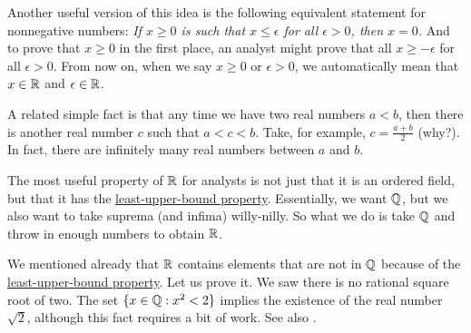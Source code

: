 Another useful version of this idea is the following equivalent
statement for nonnegative numbers: \emph{If $x \geq 0$ is such that $x \leq \epsilon$ for all
$\epsilon > 0$, then $x = 0$.}
And to prove that $x \geq 0$ in the first place, an analyst might prove
that all $x \geq -\epsilon$ for all $\epsilon > 0$.
From now on, when we say $x \geq 0$ or
$\epsilon > 0$, we automatically mean that $x \in {\mathbb{R}}$ and $\epsilon \in {\mathbb{R}}$.

A related simple fact is that 
any time we have two real numbers $a < b$, then there is another
real number $c$ such that
$a < c < b$.  Take, for example, $c = \frac{a+b}{2}$ (why?).  In fact,
there are infinitely many real numbers between $a$ and $b$.

The most useful property of ${\mathbb{R}}$ for analysts
is not just that it is an ordered field, but that it has the
\hyperref[defn:lub]{least-upper-bound property}.  Essentially, we want ${\mathbb{Q}}$, but we also
want to take suprema (and infima) willy-nilly.  So what we do is 
take ${\mathbb{Q}}$ and
throw in enough numbers to obtain ${\mathbb{R}}$.

We mentioned already that ${\mathbb{R}}$ contains elements that are not in ${\mathbb{Q}}$
because of the \hyperref[defn:lub]{least-upper-bound property}.  Let us
prove it.
We saw there is no
rational square root of two.  The set
$\{ x \in {\mathbb{Q}} : x^2 < 2 \}$ implies the existence of the real number
$\sqrt{2}$, although this fact requires a bit of work.  See also
.

